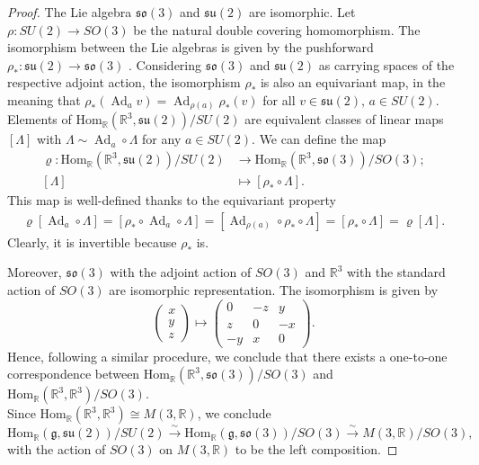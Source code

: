 \documentclass{article}
\numberwithin{equation}{section}
\theoremstyle{definition}
\newcommand{\R}{\mathbb{R}}
\newcommand{\g}{\mathfrak{g}}
\newcommand{\su}[1]{\mathfrak{su}(#1)}
\newcommand{\so}[1]{\mathfrak{so}(#1)}
\newcommand{\Ad}{\operatorname{Ad}}
\begin{document}
\begin{proof}
    The Lie algebra $\so{3}$ and $\su{2}$ are isomorphic. Let $\rho:SU(2)\to SO(3)$ be the natural double covering homomorphism. The isomorphism between the Lie algebras is given by the pushforward $\rho_*:\su{2}\to\so{3}$ \cite{Lawson_Michelsohn_1989}. Considering $\so{3}$ and $\su{2}$ as carrying spaces of the respective adjoint action, the isomorphism $\rho_*$ is also an equivariant map, in the meaning that $\rho_*(\Ad_a v)=\Ad_{\rho(a)}\rho_*(v)$ for all $v\in\su{2},\,a\in SU(2)$.\\
    Elements of $\mathrm{Hom}_{\R}(\R^3,\su{2)}/SU(2)$ are equivalent classes of linear maps $[\Lambda]$ with $\Lambda\sim \Ad_a\circ\Lambda$ for any $a\in SU(2)$. We can define the map
    \begin{align*}
        \varrho:\mathrm{Hom}_{\R}(\R^3,\su{2)}/SU(2)&\to\mathrm{Hom}_{\R}(\R^3,\so{3})/SO(3);\\
        [\Lambda] &\mapsto [\rho_*\circ \Lambda].
    \end{align*}
    This map is well-defined thanks to the equivariant property 
    \begin{align*}
        \varrho[\Ad_a \circ \Lambda]=[\rho_*\circ\Ad_a \circ \Lambda]=[\Ad_{\rho(a)}\circ\rho_*\circ\Lambda]=[\rho_*\circ\Lambda]=\varrho[\Lambda].
    \end{align*}
    Clearly, it is invertible because $\rho_*$ is.

    \medskip

    Moreover, $\so{3}$ with the adjoint action of $SO(3)$ and $\R^3$ with the standard action of $SO(3)$ are isomorphic representation. The isomorphism is given by
    \begin{equation*}
        \begin{pmatrix}
            x\\
            y\\
            z
        \end{pmatrix}\mapsto\begin{pmatrix}
            0 & -z & y\\
            z & 0 & -x\\
            -y & x & 0
        \end{pmatrix}.
    \end{equation*}
    Hence, following a similar procedure, we conclude that there exists a one-to-one correspondence between $\mathrm{Hom}_{\R}(\R^3,\so{3})/SO(3)$ and $\mathrm{Hom}_{\R}(\R^3,\R^3)/SO(3)$.\\ Since $\mathrm{Hom}_{\R}(\R^3,\R^3)\cong M(3,\R)$, we conclude
    \begin{equation}
        \mathrm{Hom}_{\R}(\g,\su{2)}/SU(2)\xrightarrow{\sim}\mathrm{Hom}_{\R}(\g,\so{3})/SO(3)\xrightarrow{\sim}M(3,\R)/SO(3),
    \end{equation}
    with the action of $SO(3)$ on $M(3,\R)$ to be the left composition.
\end{proof}
\end{document}

